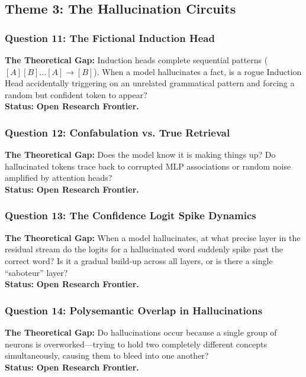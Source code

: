\documentclass[journal,10pt,twocolumn]{IEEEtran}
\begin{document}
\subsection{Theme 3: The Hallucination Circuits}

\subsubsection{Question 11: The Fictional Induction Head}
\textbf{The Theoretical Gap:} Induction heads \cite{olsson2022context} complete sequential patterns ($[A][B] \dots [A] \to [B]$). When a model hallucinates a fact, is a rogue Induction Head accidentally triggering on an unrelated grammatical pattern and forcing a random but confident token to appear? \\
\textbf{Status:} \textbf{Open Research Frontier.}

\subsubsection{Question 12: Confabulation vs. True Retrieval}
\textbf{The Theoretical Gap:} Does the model know it is making things up? Do hallucinated tokens trace back to corrupted MLP associations or random noise amplified by attention heads? \\
\textbf{Status:} \textbf{Open Research Frontier.}

\subsubsection{Question 13: The Confidence Logit Spike Dynamics}
\textbf{The Theoretical Gap:} When a model hallucinates, at what precise layer in the residual stream do the logits for a hallucinated word suddenly spike past the correct word? Is it a gradual build-up across all layers, or is there a single ``saboteur'' layer? \\
\textbf{Status:} \textbf{Open Research Frontier.}

\subsubsection{Question 14: Polysemantic Overlap in Hallucinations}
\textbf{The Theoretical Gap:} Do hallucinations occur because a single group of neurons is overworked---trying to hold two completely different concepts simultaneously, causing them to bleed into one another? \\
\textbf{Status:} \textbf{Open Research Frontier.}
\end{document}
